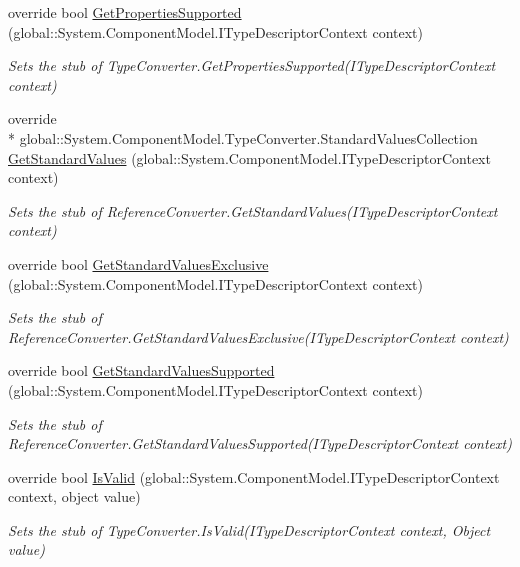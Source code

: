 \begin{DoxyCompactItemize}
override bool \hyperlink{class_system_1_1_component_model_1_1_fakes_1_1_stub_reference_converter_aa637013bb32539be5eb0e1896bfbcf65}{Get\-Properties\-Supported} (global\-::\-System.\-Component\-Model.\-I\-Type\-Descriptor\-Context context)
\begin{DoxyCompactList}\small\item\em Sets the stub of Type\-Converter.\-Get\-Properties\-Supported(\-I\-Type\-Descriptor\-Context context)\end{DoxyCompactList}\item 
override \\*
global\-::\-System.\-Component\-Model.\-Type\-Converter.\-Standard\-Values\-Collection \hyperlink{class_system_1_1_component_model_1_1_fakes_1_1_stub_reference_converter_a2050f7a7a731cfc7b443403b09a6a8e0}{Get\-Standard\-Values} (global\-::\-System.\-Component\-Model.\-I\-Type\-Descriptor\-Context context)
\begin{DoxyCompactList}\small\item\em Sets the stub of Reference\-Converter.\-Get\-Standard\-Values(\-I\-Type\-Descriptor\-Context context)\end{DoxyCompactList}\item 
override bool \hyperlink{class_system_1_1_component_model_1_1_fakes_1_1_stub_reference_converter_a4075c3bd6c7a2e1797b3216f1f4b90db}{Get\-Standard\-Values\-Exclusive} (global\-::\-System.\-Component\-Model.\-I\-Type\-Descriptor\-Context context)
\begin{DoxyCompactList}\small\item\em Sets the stub of Reference\-Converter.\-Get\-Standard\-Values\-Exclusive(\-I\-Type\-Descriptor\-Context context)\end{DoxyCompactList}\item 
override bool \hyperlink{class_system_1_1_component_model_1_1_fakes_1_1_stub_reference_converter_a66e9fba2db5958bbaa0af65eae9c7032}{Get\-Standard\-Values\-Supported} (global\-::\-System.\-Component\-Model.\-I\-Type\-Descriptor\-Context context)
\begin{DoxyCompactList}\small\item\em Sets the stub of Reference\-Converter.\-Get\-Standard\-Values\-Supported(\-I\-Type\-Descriptor\-Context context)\end{DoxyCompactList}\item 
override bool \hyperlink{class_system_1_1_component_model_1_1_fakes_1_1_stub_reference_converter_afa0521c06af2778cd7492941d8dadea6}{Is\-Valid} (global\-::\-System.\-Component\-Model.\-I\-Type\-Descriptor\-Context context, object value)
\begin{DoxyCompactList}\small\item\em Sets the stub of Type\-Converter.\-Is\-Valid(\-I\-Type\-Descriptor\-Context context, Object value)\end{DoxyCompactList}\end{DoxyCompactItemize}
